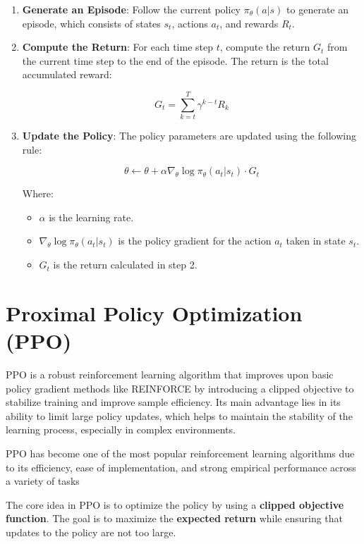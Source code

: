 \documentclass[
]{book}
\providecommand{\tightlist}{%
  \setlength{\itemsep}{0pt}\setlength{\parskip}{0pt}}
\begin{document}
\begin{enumerate}
\def\labelenumi{\arabic{enumi}.}
\item
  \textbf{Generate an Episode}: Follow the current policy \(\pi_\theta(a | s)\) to generate an episode, which consists of states \(s_t\), actions \(a_t\), and rewards \(R_t\).
\item
  \textbf{Compute the Return}: For each time step \(t\), compute the return \(G_t\) from the current time step to the end of the episode. The return is the total accumulated reward:

  \[
  G_t = \sum_{k=t}^{T} \gamma^{k-t} R_k
  \]
\item
  \textbf{Update the Policy}: The policy parameters are updated using the following rule:

  \[
  \theta \leftarrow \theta + \alpha \nabla_\theta \log \pi_\theta(a_t | s_t) \cdot G_t
  \]

  Where:

  \begin{itemize}
  \tightlist
  \item
    \(\alpha\) is the learning rate.
  \item
    \(\nabla_\theta \log \pi_\theta(a_t | s_t)\) is the policy gradient for the action \(a_t\) taken in state \(s_t\).
  \item
    \(G_t\) is the return calculated in step 2.
  \end{itemize}
\end{enumerate}

\section{\texorpdfstring{\textbf{Proximal Policy Optimization (PPO)}}{Proximal Policy Optimization (PPO)}}\label{proximal-policy-optimization-ppo-1}

PPO is a robust reinforcement learning algorithm that improves upon basic policy gradient methods like REINFORCE by introducing a clipped objective to stabilize training and improve sample efficiency. Its main advantage lies in its ability to limit large policy updates, which helps to maintain the stability of the learning process, especially in complex environments.

PPO has become one of the most popular reinforcement learning algorithms due to its efficiency, ease of implementation, and strong empirical performance across a variety of tasks

The core idea in PPO is to optimize the policy by using a \textbf{clipped objective function}. The goal is to maximize the \textbf{expected return} while ensuring that updates to the policy are not too large.
\end{document}
